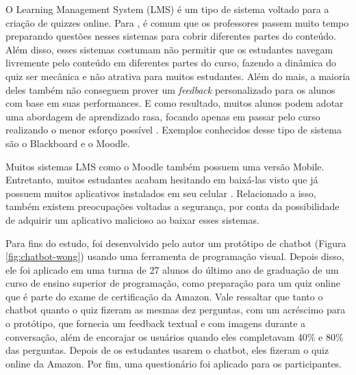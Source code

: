 O Learning Management System (LMS) é um tipo de sistema voltado para a criação de quizzes online. Para , é comum que os professores passem muito tempo preparando questões nesses sistemas para cobrir diferentes partes do conteúdo. Além disso, esses sistemas costumam não permitir que os estudantes navegam livremente pelo conteúdo em diferentes partes do curso, fazendo a dinâmica do quiz ser mecânica e não atrativa para muitos estudantes. Além do mais, a maioria deles também não conseguem prover um \textit{feedback} personalizado para os alunos com base em suas performances. E como resultado, muitos alunos podem adotar uma abordagem de aprendizado rasa, focando apenas em passar pelo curso realizando o menor esforço possível . Exemplos conhecidos desse tipo de sistema são o Blackboard e o Moodle.

Muitos sistemas LMS como o Moodle também possuem uma versão Mobile. Entretanto, muitos estudantes acabam hesitando em baixá-las visto que já possuem muitos aplicativos instalados em seu celular . Relacionado a isso, também existem preocupações voltadas a segurança, por conta da possibilidade de adquirir um aplicativo malicioso ao baixar esses sistemas.


Para fins do estudo, foi desenvolvido pelo autor um protótipo de chatbot (Figura \ref{fig:chatbot-wong}) usando uma ferramenta de programação visual. Depois disso, ele foi aplicado em uma turma de 27 alunos do último ano de graduação de um curso de ensino superior de programação, como preparação para um quiz online que é parte do exame de certificação da Amazon. Vale ressaltar que tanto o chatbot quanto o quiz fizeram as mesmas dez perguntas, com um acréscimo para o protótipo, que fornecia um feedback textual e com imagens durante a conversação, além de encorajar os usuários quando eles completavam 40\% e 80\% das perguntas. Depois de os estudantes usarem o chatbot, eles fizeram o quiz online da Amazon. Por fim, uma questionário foi aplicado para os participantes.

